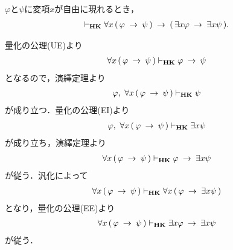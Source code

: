 	\begin{screen}
		\begin{thm}
		\label{classic:no_description_1}
			$\varphi$と$\psi$に変項$x$が自由に現れるとき，
			\begin{align}
				\vdash_{{\scriptsize \mbox{{\bf HK}}}} \forall x\, (\, \varphi \hspace{0.25em}\rightarrow\hspace{0.25em} \psi\, )
				\hspace{0.25em}\rightarrow\hspace{0.25em} (\, \exists x \varphi \hspace{0.25em}\rightarrow\hspace{0.25em} \exists x \psi\, ).
			\end{align}
		\end{thm}
	\end{screen}
	
	\begin{sketch}
		量化の公理(UE)より
		\begin{align}
			\forall x\, (\, \varphi \hspace{0.25em}\rightarrow\hspace{0.25em} \psi\, ) \vdash_{{\scriptsize \mbox{{\bf HK}}}}
			\varphi \hspace{0.25em}\rightarrow\hspace{0.25em} \psi
		\end{align}
		となるので，演繹定理より
		\begin{align}
			\varphi,\ \forall x\, (\, \varphi \hspace{0.25em}\rightarrow\hspace{0.25em} \psi\, ) 
			\vdash_{{\scriptsize \mbox{{\bf HK}}}} \psi
		\end{align}
		が成り立つ．量化の公理(EI)より
		\begin{align}
			\varphi,\ \forall x\, (\, \varphi \hspace{0.25em}\rightarrow\hspace{0.25em} \psi\, ) 
			\vdash_{{\scriptsize \mbox{{\bf HK}}}} \exists x \psi
		\end{align}
		が成り立ち，演繹定理より
		\begin{align}
			\forall x\, (\, \varphi \hspace{0.25em}\rightarrow\hspace{0.25em} \psi\, ) 
			\vdash_{{\scriptsize \mbox{{\bf HK}}}} \varphi \hspace{0.25em}\rightarrow\hspace{0.25em} \exists x \psi
		\end{align}
		が従う．汎化によって
		\begin{align}
			\forall x\, (\, \varphi \hspace{0.25em}\rightarrow\hspace{0.25em} \psi\, ) \vdash_{{\scriptsize \mbox{{\bf HK}}}} 
			\forall x\, (\, \varphi \hspace{0.25em}\rightarrow\hspace{0.25em} \exists x \psi\, )
		\end{align}
		となり，量化の公理(EE)より
		\begin{align}
			\forall x\, (\, \varphi \hspace{0.25em}\rightarrow\hspace{0.25em} \psi\, ) \vdash_{{\scriptsize \mbox{{\bf HK}}}} 
			\exists x \varphi \hspace{0.25em}\rightarrow\hspace{0.25em} \exists x \psi
		\end{align}
		が従う．
		\QED
	\end{sketch}